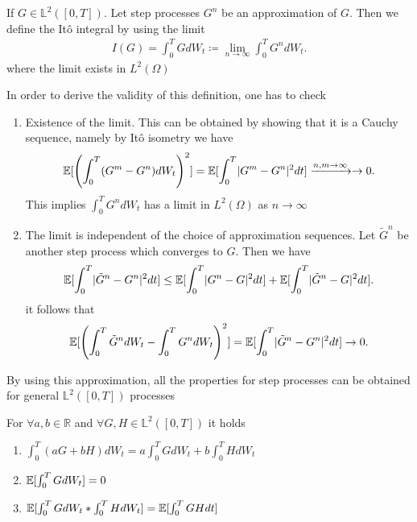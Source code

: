 \begin{definition}[It\^o Integral]\label{ito_integral}
  If $G \in  \mathbb{L}^2([0,T])$. Let step processes $G^{n} $ be an approximation of $G$. Then we define
  the It\^o  integral by using the limit 
  \begin{align*}
    I(G) = \int_0^{T} GdW_t \coloneqq  \lim_{n\to \infty} \int_0^{T} G^{n} dW_t
  .\end{align*}
  where the limit exists in $L^2(\Omega)$
\end{definition}
In order to derive the validity of this definition, one has to check 
\begin{enumerate}
  \item Existence of the limit. This can be obtained by showing that it is a Cauchy sequence, namely by It\^o isometry we have
    \begin{align*}
      \mathbb{E}[\left( \int_0^{T} (G^{m} - G^{n}  ) dW_t  \right)^2 ] = \mathbb{E}[\int_0^{T} \lvert G^{m} - G^{n}  \rvert^2 dt] \xrightarrow{n,m\to \infty} \to 0
    .\end{align*}
    This implies $\int_0^{T} G^{n} dW_t  $ has a limit in $L^2(\Omega )$ as $n\to \infty$
  \item The limit is independent of the choice of approximation sequences.
    Let $\tilde{G}^{n}  $ be another step process which converges to $G$. Then we have 
    \begin{align*}
      \mathbb{E}[\int_0^{T} \lvert\tilde{G}^{n} - G^{n}   \rvert^2 dt ] \le  \mathbb{E}[\int_0^{T} \lvert G^{n} - G \rvert^2 dt ] + \mathbb{E}[\int_0^{T} \lvert\tilde{G}^{n} - G  \rvert^2 dt ]
    .\end{align*}
    it follows that 
    \begin{align*}
      \mathbb{E}[\left( \int_0^{T} \tilde{G}^{n} dW_t - \int_0^{T} G^{n} dW_t      \right)^2 ] = \mathbb{E}[\int_0^{T} \lvert\tilde{G}^{n} - G^{n}   \rvert^2 dt ] \to 0
    .\end{align*}
\end{enumerate}
By using this approximation, all the properties for step  processes can be obtained for general $\mathbb{L}^2([0,T])$ processes
\begin{theorem}
  For $\forall  a,b \in  \mathbb{R}$  and $\forall  G,H \in \mathbb{L}^2([0,T])$ it holds 
  \begin{enumerate}
    \item $\int_0^{T} (aG+bH) dW_t = a\int_0^{T} GdW_t + b\int_0^{T} H dW_t   $ 
    \item $\mathbb{E}[\int_0^{T} GdW_t ] = 0$
    \item $\mathbb{E}[\int_0^{T} GdW_t * \int_0^{T} HdW_t  ] = \mathbb{E}[\int_0^{T} GH dt ]$
  \end{enumerate}
\end{theorem}
